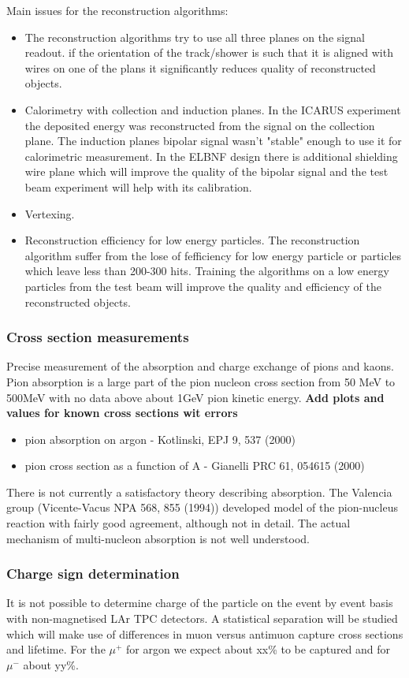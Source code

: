 Main issues for the reconstruction algorithms:
\begin{itemize}
\item The reconstruction algorithms try to use all three planes on the signal readout. if the orientation of the track/shower is such that it is aligned with wires on one of the plans it significantly reduces quality of reconstructed objects. 
\item Calorimetry with collection and induction planes. In the ICARUS experiment the deposited energy was reconstructed from the signal on the collection plane. The induction planes bipolar signal wasn't "stable" enough to use it for calorimetric measurement. In the ELBNF design there is additional shielding  wire plane which will improve the quality of the bipolar signal and the  test beam experiment will help with its calibration.
\item   Vertexing.
\item Reconstruction efficiency for low energy particles. The reconstruction algorithm suffer from the lose of fefficiency for low energy particle or particles which leave less than 200-300 hits. Training the algorithms on a low energy particles from the test beam will improve the quality and efficiency of the reconstructed objects.
\end{itemize}



\subsubsection{Cross section measurements}
Precise measurement of the  absorption and charge exchange of pions and kaons. Pion absorption is a large part of the pion nucleon cross section from 50 MeV to 500MeV with no data above about 1GeV pion kinetic energy. 
{\bf Add plots and values for known cross sections wit errors} 
\begin{itemize}
\item pion absorption on argon - Kotlinski, EPJ 9, 537 (2000)
\item pion cross section as a function of A - Gianelli PRC 61, 054615 (2000)
\end{itemize}
There is not currently a satisfactory theory describing absorption. The Valencia group (Vicente-Vacus NPA 568, 855 (1994)) developed model of    the pion-nucleus reaction with fairly good agreement, although not in detail. The actual  mechanism of multi-nucleon absorption
 is not well understood. 
 
\subsubsection{Charge sign determination}
It is not possible to determine charge of the particle on the event by event basis with non-magnetised LAr TPC detectors. A statistical separation will be studied which will make use of differences in muon versus antimuon capture cross sections and lifetime.
For the $\mu^+$ for argon we expect about xx\% to be captured and for $\mu^-$ about yy\%. 

